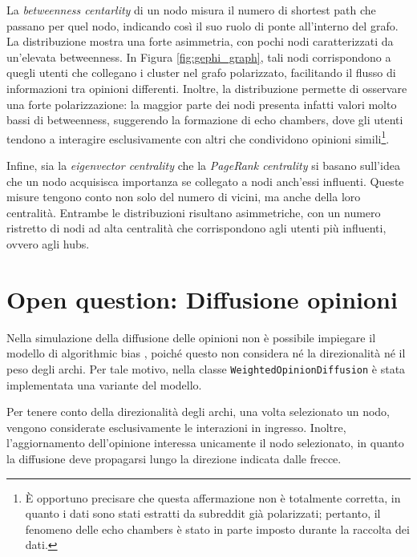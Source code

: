 \documentclass[sigchi]{acmart}
\begin{document}
La \textit{betweenness centarlity} di un nodo misura il numero di shortest path che passano per quel nodo, indicando così il suo ruolo di ponte all'interno del grafo. La distribuzione mostra una forte asimmetria, con pochi nodi caratterizzati da un'elevata betweenness. In Figura \ref{fig:gephi_graph}, tali nodi corrispondono a quegli utenti che collegano i cluster nel grafo polarizzato, facilitando il flusso di informazioni tra opinioni differenti. Inoltre, la distribuzione permette di osservare una forte polarizzazione: la maggior parte dei nodi presenta infatti valori molto bassi di betweenness, suggerendo la formazione di echo chambers, dove gli utenti tendono a interagire esclusivamente con altri che condividono opinioni simili\footnote{È opportuno precisare che questa affermazione non è totalmente corretta, in quanto i dati sono stati estratti da subreddit già polarizzati; pertanto, il fenomeno delle echo chambers è stato in parte imposto durante la raccolta dei dati.}.

Infine, sia la \textit{eigenvector centrality }che la \textit{PageRank centrality} si basano sull'idea che un nodo acquisisca importanza se collegato a nodi anch'essi influenti.  Queste misure tengono conto non solo del numero di vicini, ma anche della loro centralità. Entrambe le distribuzioni risultano asimmetriche, con un numero ristretto di nodi ad alta centralità che corrispondono agli utenti più influenti, ovvero agli hubs.



\section{Open question: Diffusione opinioni} \label{sec:diffusion_opinion}
Nella simulazione della diffusione delle opinioni non è possibile impiegare il modello di algorithmic bias \cite{sirbu2019algorithmic}, poiché questo non considera né la direzionalità né il peso degli archi. Per tale motivo, nella classe \texttt{WeightedOpinionDiffusion} è stata implementata una variante del modello.

Per tenere conto della direzionalità degli archi, una volta selezionato un nodo, vengono considerate esclusivamente le interazioni in ingresso. Inoltre, l'aggiornamento dell'opinione interessa unicamente il nodo selezionato, in quanto la diffusione deve propagarsi lungo la direzione indicata dalle frecce.
\end{document}
